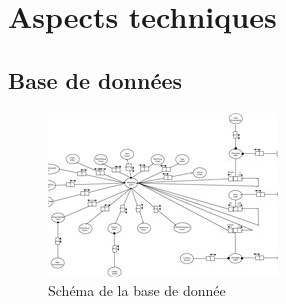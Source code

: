 \documentclass{beamer}
\begin{document}
\section{Aspects techniques}

\subsection{Base de données}

\begin{frame}
  \begin{figure} 
  	\centering 
  	\includegraphics[scale=0.9]{pictures/schema_database.jpg} 
  	\caption{Schéma de la base de donnée} 
  	\label{fig:my_label} 
  \end{figure}
\end{frame}
\end{document}
